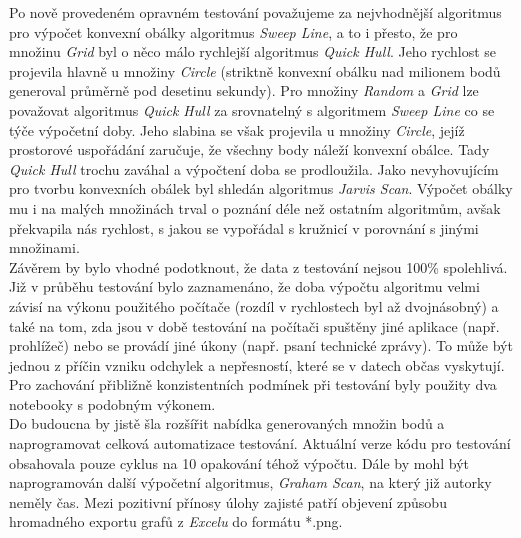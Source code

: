 \documentclass[a4paper, 12pt]{article}
\begin{document}
Po nově provedeném opravném testování považujeme za nejvhodnější algoritmus pro výpočet konvexní obálky algoritmus \textit{Sweep Line}, a to i přesto, že pro množinu \textit{Grid} byl o něco málo rychlejší algoritmus \textit{Quick Hull}. Jeho rychlost se projevila hlavně u množiny \textit{Circle} (striktně konvexní obálku nad milionem bodů generoval průměrně pod desetinu sekundy). Pro množiny \textit{Random} a \textit{Grid} lze považovat algoritmus \textit{Quick Hull} za srovnatelný s algoritmem \textit{Sweep Line} co se týče výpočetní doby. Jeho slabina se však projevila u množiny \textit{Circle}, jejíž prostorové uspořádání zaručuje, že všechny body náleží konvexní obálce. Tady \textit{Quick Hull} trochu zaváhal a výpočtení doba se prodloužila. Jako nevyhovujícím pro tvorbu konvexních obálek byl shledán algoritmus \textit{Jarvis Scan}. Výpočet obálky mu i na malých množinách trval o poznání déle než ostatním algoritmům, avšak překvapila nás rychlost, s jakou se vypořádal s kružnicí v porovnání s jinými množinami.\\

Závěrem by bylo vhodné podotknout, že data z testování nejsou 100\% spolehlivá. Již v průběhu testování bylo zaznamenáno, že doba výpočtu algoritmu velmi závisí na výkonu použitého počítače (rozdíl v rychlostech byl až dvojnásobný) a také na tom, zda jsou v době testování na počítači spuštěny jiné aplikace (např. prohlížeč) nebo se provádí jiné úkony (např. psaní technické zprávy). To může být jednou z příčin vzniku odchylek a nepřesností, které se v datech občas vyskytují. Pro zachování přibližně konzistentních podmínek při testování byly použity dva notebooky s podobným výkonem.\\

Do budoucna by jistě šla rozšířit nabídka generovaných množin bodů a naprogramovat celková automatizace testování. Aktuální verze kódu pro testování obsahovala pouze cyklus na 10 opakování téhož výpočtu. Dále by mohl být naprogramován další výpočetní algoritmus, \textit{Graham Scan}, na který již autorky neměly čas. Mezi pozitivní přínosy úlohy zajisté patří objevení způsobu hromadného exportu grafů z \textit{Excelu} do formátu *.png.

\clearpage
\end{document}
